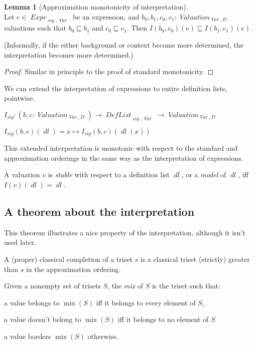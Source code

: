 \documentclass[oneside,12pt]{book}
\theoremstyle{definition}
\newtheorem{lemma}[theorem]{Lemma}
\theoremstyle{remark}
\newcommand\var[1]{\mathop{\mathit{#1}}\nolimits}
\newcommand{\approximates}{\sqsubseteq}
\newcommand{\sig}{\var{sig}}
\newcommand{\Var}{\var{Var}}
\newcommand{\Valuation}{\var{Valuation}}
\newcommand{\Expr}{\var{Expr}}
\newcommand{\DefList}{\var{DefList}}
\newcommand{\dl}{\var{dl}}
\DeclareMathOperator{\mix}{mix}
\begin{document}
\begin{lemma}[Approximation monotonicity of interpretation]
\label{monoInterpKnow} \hfill \\
  Let $e \in \Expr_{\sig,\Var}$ be an expression, and 
  $b_0, b_1, c_0, c_1\colon \Valuation_{\Var,D}$ valuations such that
  $b_0 \approximates b_1$ and $c_0 \approximates c_1$.
  Then $I(b_0, c_0)(e) \approximates I(b_1, c_1)(e)$.
  
  (Informally, if the either background or context become more determined,
  the interpretation becomes more determined.)
\end{lemma}
\begin{proof}
  Similar in principle to the proof of standard monotonicity.
\end{proof}

We can extend the interpretation of expressions to entire definition lists,
pointwise.

\begin{defBox}
  $I_{\sig}\colon (b,c\colon \Valuation_{\Var,D}) \to \DefList_{\sig,\Var}
    \to \Valuation_{\Var,D}$
  
  \medskip \noindent
  $I_{\sig}(b, c)(\dl) = x \mapsto I_{\sig}(b, c)(\dl(x))$
\end{defBox}

This extended interpretation is monotonic with respect to the standard and
approximation orderings in the same way as the interpretation of expressions.

\begin{defBox}
  A valuation $v$ is \textit{stable} with respect to a definition list $\dl$,
  or a \textit{model} of $\dl$, iff $I(v)(\dl) = \dl$.
\end{defBox}

\subsection{A theorem about the interpretation}
This theorem illustrates a nice property of the interpretation, although it
isn't used later.

\begin{defBox}
  A (proper) classical completion of a triset $s$ is a classical triset
  (strictly) greater than $s$ in the approximation ordering.
  
  
  \medskip \noindent Given a nonempty set of trisets $S$, the \textit{mix} of $S$
  is the triset such that:
  \begin{compactitem}
    \item a value belongs to $\mix(S)$ iff it belongs to every element of $S$,
    \item a value doesn't belong to $\mix(S)$ iff it belongs to no element of $S$
    \item a value borders $\mix(S)$ otherwise.
  \end{compactitem}
\end{defBox}
\end{document}
